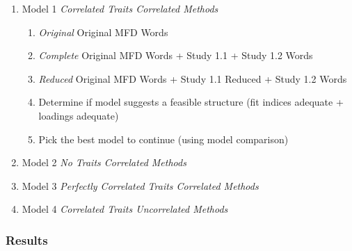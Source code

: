 \documentclass[
  man,floatsintext]{apa6}
\providecommand{\tightlist}{%
  \setlength{\itemsep}{0pt}\setlength{\parskip}{0pt}}
\begin{document}
\begin{enumerate}
\def\labelenumi{\arabic{enumi}.}
\tightlist
\item
  Model 1 \emph{Correlated Traits Correlated Methods}

  \begin{enumerate}
  \def\labelenumii{\alph{enumii}.}
  \tightlist
  \item
    \emph{Original} Original MFD Words
  \item
    \emph{Complete} Original MFD Words + Study 1.1 + Study 1.2 Words
  \item
    \emph{Reduced} Original MFD Words + Study 1.1 Reduced + Study 1.2 Words
  \item
    Determine if model suggests a feasible structure (fit indices
    adequate + loadings adequate)
  \item
    Pick the best model to continue (using model comparison)
  \end{enumerate}
\item
  Model 2 \emph{No Traits Correlated Methods}
\item
  Model 3 \emph{Perfectly Correlated Traits Correlated Methods}
\item
  Model 4 \emph{Correlated Traits Uncorrelated Methods}
\end{enumerate}

\subsubsection{Results}\label{results-2}
\end{document}

